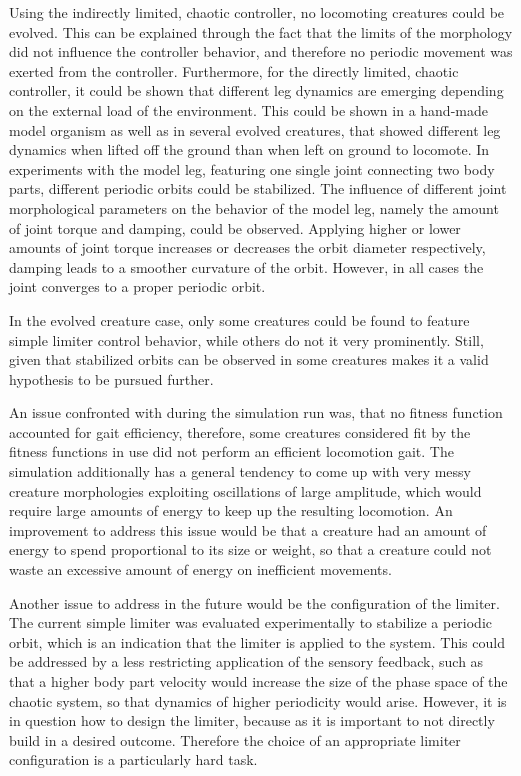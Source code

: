 \documentclass[main]{subfiles}
\begin{document}
%
Using the indirectly limited, chaotic controller, no locomoting creatures could be evolved. %
%
This can be explained through the fact that the limits of the morphology did not influence the controller behavior, and therefore no periodic movement was exerted from the controller. %
%
Furthermore, for the directly limited, chaotic controller, it could be shown that different leg dynamics are emerging depending on the external load of the environment. %
%
This could be shown in a hand-made model organism as well as in several evolved creatures, that showed different leg dynamics when lifted off the ground than when left on ground to locomote. %
%
In experiments with the model leg, featuring one single joint connecting two body parts, different periodic orbits could be stabilized. 
%
The influence of different joint morphological parameters on the behavior of the model leg, namely the amount of joint torque and damping, could be observed. %
%
Applying higher or lower amounts of joint torque increases or decreases the orbit diameter respectively, damping leads to a smoother curvature of the orbit. %
%
However, in all cases the joint converges to a proper periodic orbit.

In the evolved creature case, only some creatures could be found to feature simple limiter control behavior, while others do not it very prominently. %
%
Still, given that stabilized orbits can be observed in some creatures makes it a valid hypothesis to be pursued further.

An issue confronted with during the simulation run was, that no fitness function accounted for gait efficiency, therefore, some creatures considered fit by the fitness functions in use did not perform an efficient locomotion gait. %
%
The simulation additionally has a general tendency to come up with very messy creature morphologies exploiting oscillations of large amplitude, which would require large amounts of energy to keep up the resulting locomotion. %
%
An improvement to address this issue would be that a creature had an amount of energy to spend proportional to its size or weight, so that a creature could not waste an excessive amount of energy on inefficient movements. 

Another issue to address in the future would be the configuration of the limiter. %
%
The current simple limiter was evaluated experimentally to stabilize a periodic orbit, which is an indication that the limiter is applied to the system. %
%
This could be addressed by a less restricting application of the sensory feedback, such as that a higher body part velocity would increase the size of the phase space of the chaotic system, so that dynamics of higher periodicity would arise. %
%
However, it is in question how to design the limiter, because as it is important to not directly build in a desired outcome. %
%
Therefore the choice of an appropriate limiter configuration is a particularly hard task.
\end{document}
